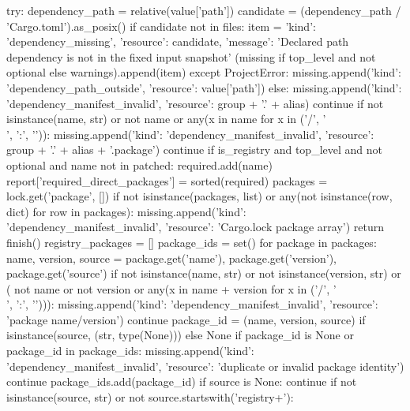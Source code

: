                         try:
                            dependency_path = relative(value['path'])
                            candidate = (dependency_path / 'Cargo.toml').as_posix()
                            if candidate not in files:
                                item = {'kind': 'dependency_missing', 'resource': candidate,
                                        'message': 'Declared path dependency is not in the fixed input snapshot'}
                                (missing if top_level and not optional else warnings).append(item)
                        except ProjectError:
                            missing.append({'kind': 'dependency_path_outside', 'resource': value['path']})
                else:
                    missing.append({'kind': 'dependency_manifest_invalid', 'resource': group + '.' + alias})
                    continue
                if not isinstance(name, str) or not name or any(x in name for x in ('/', '\\', ':', '\0')):
                    missing.append({'kind': 'dependency_manifest_invalid', 'resource': group + '.' + alias + '.package'})
                    continue
                if is_registry and top_level and not optional and name not in patched:
                    required.add(name)
        report['required_direct_packages'] = sorted(required)
        packages = lock.get('package', [])
        if not isinstance(packages, list) or any(not isinstance(row, dict) for row in packages):
            missing.append({'kind': 'dependency_manifest_invalid', 'resource': 'Cargo.lock package array'})
            return finish()
        registry_packages = []
        package_ids = set()
        for package in packages:
            name, version, source = package.get('name'), package.get('version'), package.get('source')
            if not isinstance(name, str) or not isinstance(version, str) or (
                    not name or not version or any(x in name + version for x in ('/', '\\', ':', '\0'))):
                missing.append({'kind': 'dependency_manifest_invalid', 'resource': 'package name/version'})
                continue
            package_id = (name, version, source) if isinstance(source, (str, type(None))) else None
            if package_id is None or package_id in package_ids:
                missing.append({'kind': 'dependency_manifest_invalid', 'resource': 'duplicate or invalid package identity'})
                continue
            package_ids.add(package_id)
            if source is None:
                continue
            if not isinstance(source, str) or not source.startswith('registry+'):
